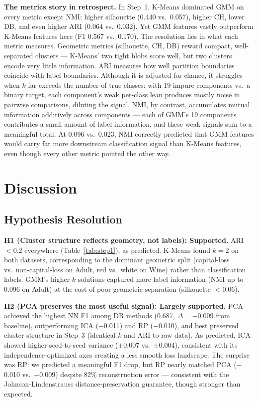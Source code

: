 \documentclass[conference]{IEEEtran}
\begin{document}
\textbf{The metrics story in retrospect.} In Step~1, K-Means
dominated GMM on every metric except NMI: higher silhouette (0.440
vs.\ 0.057), higher CH, lower DB, and even higher ARI (0.064 vs.\
0.032). Yet GMM features vastly outperform K-Means features here
(F1 0.567 vs.\ 0.170). The resolution lies in what each metric
measures. Geometric metrics (silhouette, CH, DB) reward compact,
well-separated clusters --- K-Means' two tight blobs score well, but
two clusters encode very little information. ARI measures how well partition boundaries coincide with label
boundaries. Although it is adjusted for chance, it struggles when
$k$ far exceeds the number of true classes: with 19 impure components
vs.\ a binary target, each component's weak per-class lean produces
mostly noise in pairwise comparisons, diluting the signal. NMI, by
contrast, accumulates mutual information additively across
components --- each of GMM's 19 components contributes a small amount
of label information, and these weak signals sum to a meaningful
total. At 0.096 vs.\ 0.023, NMI
correctly predicted that GMM features would carry far more downstream
classification signal than K-Means features, even though every other
metric pointed the other way.

\section{Discussion}

\subsection{Hypothesis Resolution}

\textbf{H1 (Cluster structure reflects geometry, not labels):
Supported.} ARI $< 0.2$ everywhere (Table~\ref{tab:step1}), as
predicted. K-Means found $k{=}2$ on both datasets, corresponding to
the dominant geometric split (capital-loss vs.\ non-capital-loss on
Adult, red vs.\ white on Wine) rather than classification labels.
GMM's higher-$k$ solutions captured more label information (NMI up to
0.096 on Adult) at the cost of poor geometric separation (silhouette
$< 0.06$).

\textbf{H2 (PCA preserves the most useful signal): Largely
supported.} PCA achieved the highest NN F1 among DR methods (0.687,
$\Delta$$=$${-}$0.009 from baseline), outperforming ICA ($-$0.011)
and RP ($-$0.010), and best preserved cluster structure in Step~3
(identical $k$ and ARI to raw data). As predicted, ICA showed higher
seed-to-seed variance ($\pm$0.007 vs.\ $\pm$0.004), consistent with
its independence-optimized axes creating a less smooth loss landscape.
The surprise was RP: we predicted a meaningful F1 drop, but RP nearly
matched PCA ($-$0.010 vs.\ $-$0.009) despite 82\% reconstruction
error --- consistent with the Johnson-Lindenstrauss distance-preservation
guarantee, though stronger than expected.
\end{document}
